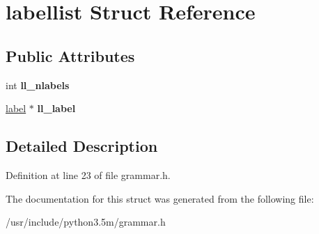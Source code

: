 \hypertarget{structlabellist}{}\section{labellist Struct Reference}
\label{structlabellist}
\subsection*{Public Attributes}
\begin{DoxyCompactItemize}
\item 
int {\bfseries ll\+\_\+nlabels}\hypertarget{structlabellist_a5db03d4e55f346dbc9d94dce8ae0733e}{}\label{structlabellist_a5db03d4e55f346dbc9d94dce8ae0733e}

\item 
\hyperlink{structlabel}{label} $\ast$ {\bfseries ll\+\_\+label}\hypertarget{structlabellist_a24e33547b17e39e8a3d072ea498bffcd}{}\label{structlabellist_a24e33547b17e39e8a3d072ea498bffcd}

\end{DoxyCompactItemize}


\subsection{Detailed Description}


Definition at line 23 of file grammar.\+h.



The documentation for this struct was generated from the following file\+:\begin{DoxyCompactItemize}
\item 
/usr/include/python3.\+5m/grammar.\+h\end{DoxyCompactItemize}
